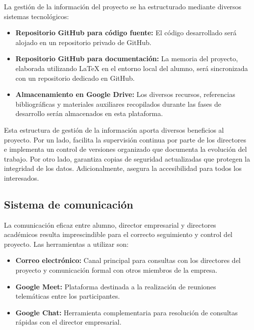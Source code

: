 La gestión de la información del proyecto se ha estructurado mediante diversos sistemas tecnológicos:
\begin{itemize}
\item \textbf{Repositorio GitHub para código fuente:} El código desarrollado será alojado en un repositorio privado de GitHub.
\item \textbf{Repositorio GitHub para documentación:} La memoria del proyecto, elaborada utilizando LaTeX en el entorno local del alumno, será sincronizada con un repositorio dedicado en GitHub.
\item \textbf{Almacenamiento en Google Drive:} Los diversos recursos, referencias bibliográficas y materiales auxiliares recopilados durante las fases de desarrollo serán almacenados en esta plataforma.
\end{itemize}
Esta estructura de gestión de la información aporta diversos beneficios al proyecto. Por un lado, facilita la supervisión continua por parte de los directores e implementa un control de versiones organizado que documenta la evolución del trabajo. Por otro lado, garantiza copias de seguridad actualizadas que protegen la integridad de los datos. Adicionalmente, asegura la accesibilidad para todos los interesados.


\subsection{Sistema de comunicación}
La comunicación eficaz entre alumno, director empresarial y directores académicos resulta imprescindible para el correcto seguimiento y control del proyecto. Las herramientas a utilizar son:
\begin{itemize}
\item\textbf{Correo electrónico: }Canal principal para consultas con los directores del proyecto y comunicación formal con otros miembros de la empresa.
\item\textbf{Google Meet: }Plataforma destinada a la realización de reuniones telemáticas entre los participantes.
\item\textbf{Google Chat: }Herramienta complementaria para resolución de consultas rápidas con el director empresarial.
\end{itemize}

